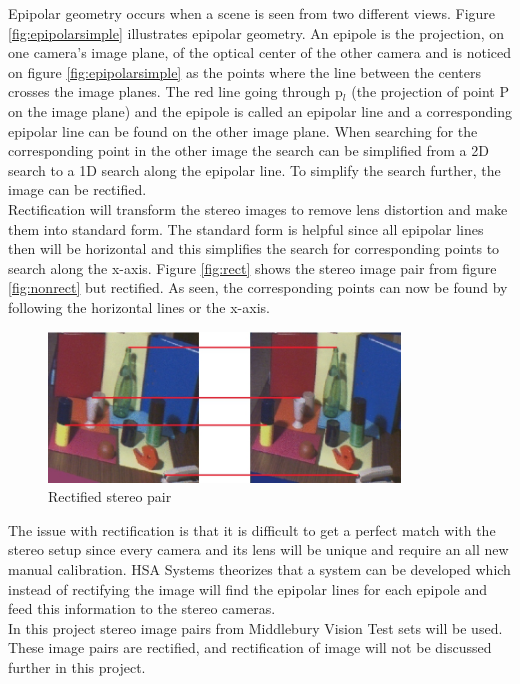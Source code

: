 Epipolar geometry occurs when a scene is seen from two different views. Figure \vref{fig:epipolarsimple} illustrates epipolar geometry. An epipole is the projection, on one camera's image plane, of the optical center of the other camera and is noticed on figure \vref{fig:epipolarsimple} as the points where the line between the centers crosses the image planes. The red line going through p$_l$ (the projection of point P on the image plane) and the epipole is called an epipolar line and a corresponding epipolar line can be found on the other image plane. When searching for the corresponding point in the other image the search can be simplified from a 2D search to a 1D search along the epipolar line. To simplify the search further, the image can be rectified.\\

Rectification will transform the stereo images to remove lens distortion and make them into standard form. The standard form is helpful since all epipolar lines then will be horizontal and this simplifies the search for corresponding points to search along the x-axis. Figure \vref{fig:rect} shows the stereo image pair from figure \vref{fig:nonrect} but rectified. As seen, the corresponding points can now be found by following the horizontal lines or the x-axis.\\

\begin{figure}[ht!]
  \centering
  \includegraphics[height=4cm]{figures/rect}
  \caption{Rectified stereo pair\label{fig:rect} \cite{Mattoccia2013}}
\end{figure}

The issue with rectification is that it is difficult to get a perfect match with the stereo setup since every camera and its lens will be unique and require an all new manual calibration. HSA Systems theorizes that a system can be developed which instead of rectifying the image will find the epipolar lines for each epipole and feed this information to the stereo cameras.\\

In this project stereo image pairs from Middlebury Vision Test sets \cite{middlebury2016} will be used. These image pairs are rectified, and rectification of image will not be discussed further in this project.

